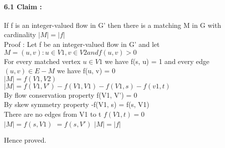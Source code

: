 \documentclass[a4paper,12pt]{article}
\begin{document}
	    
	    \paragraph*{6.1 Claim :}
	    {
	          If f is an integer-valued flow in G' then there is a matching M in G with cardinality $ |M| = |f| $   \\
	          
	          
	          Proof : Let f be an integer-valued flow in G' and let $ M = {(u, v): u \in V1, v \in V2 and f(u, v) > 0} $  \\
	          
	          For every matched vertex $ u \in V1 $ we have f(s, u) = 1 and every edge $ (u, v) \in E-M $ we have f(u, v) = 0   \\
	          
	          $              |M| = f(V1, V2) $   \\
	                        $|M| = f(V1, V') - f(V1, V1) - f(V1, s) - f(v1, t) $ \\
	                           
	                           By flow conservation property f(V1, V') = 0\\
	                           By skew symmetry property -f(V1, s) = f(s, V1)  \\
	                           There are no edges from V1 to t $  f(V1, t) = 0 $  \\
	                  
	                  $  |M| = f(s, V1)$
	                                 $ =f(s, V') $
	                                $ |M|   = |f| $
	                                
	                                Hence proved.   \\
	          
	    
	   
	   
	    }
	    
\end{document}
